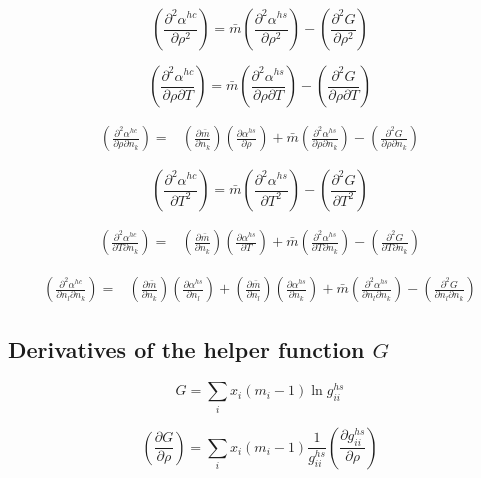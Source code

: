 \documentclass[internal,english]{sintefmemo2012}
\newcommand*{\pder}[2]{\left(\frac{\partial #1}{\partial #2}\right)}
\newcommand*{\pdder}[2]{\left(\frac{\partial^2 #1}{\partial #2^2}\right)}
\newcommand*{\pdcross}[3]{\left(\frac{\partial^2 #1}{\partial #2 \partial #3}\right)}
\begin{document}
\begin{equation}
  \pdder{\alpha^{hc}}{\rho} = \bar m \pdder{\alpha^{hs}}{\rho} - \pdder{G}{\rho}
\end{equation}

\begin{equation}
  \pdcross{\alpha^{hc}}{\rho}{T} = \bar m \pdcross{\alpha^{hs}}{\rho}{T} - \pdcross{G}{\rho}{T}
\end{equation}

\begin{equation}
  \begin{aligned}
    \pdcross{\alpha^{hc}}{\rho}{n_k} =& \pder{\bar m}{n_k} \pder{\alpha^{hs}}{\rho} + \bar m \pdcross{\alpha^{hs}}{\rho}{n_k} - \pdcross{G}{\rho}{n_k}
  \end{aligned}
\end{equation}

\begin{equation}
  \pdder{\alpha^{hc}}{T} = \bar m \pdder{\alpha^{hs}}{T} - \pdder{G}{T}
\end{equation}

\begin{equation}
  \begin{aligned}
    \pdcross{\alpha^{hc}}{T}{n_k} =& \pder{\bar m}{n_k} \pder{\alpha^{hs}}{T} + \bar m \pdcross{\alpha^{hs}}{T}{n_k} - \pdcross{G}{T}{n_k}
  \end{aligned}
\end{equation}

\begin{equation}
  \begin{aligned}
    \pdcross{\alpha^{hc}}{n_l}{n_k} =& \pder{\bar m}{n_k} \pder{\alpha^{hs}}{n_l} + \pder{\bar m}{n_l} \pder{\alpha^{hs}}{n_k} + \bar m \pdcross{\alpha^{hs}}{n_l}{n_k} - \pdcross{G}{n_l}{n_k}
  \end{aligned}
\end{equation}

\subsection*{Derivatives of the helper function $G$}
\begin{equation}
 G = \sum_i x_i(m_i-1)\ln g_{ii}^{hs}
\end{equation}

\begin{equation}
  \pder{G}{\rho} = \sum_i x_i(m_i-1) \frac{1}{g_{ii}^{hs}} \pder{g_{ii}^{hs}}{\rho}
\end{equation}
\end{document}
